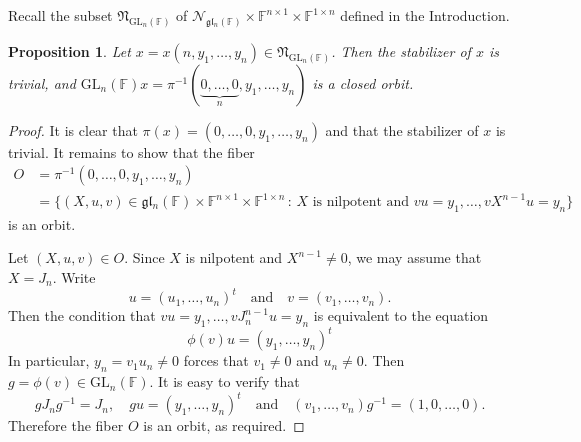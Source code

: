 \documentclass[12pt]{amsart}
\newtheorem{cor}[lm]{Corollary}
\newtheorem{prop}[lm]{Proposition}
\theoremstyle{definition}
\theoremstyle{remark}\newtheorem{rmk}[lm]{Remark}
\newcommand{\CN}{{\mathcal {N}}}
\newcommand{\GL}{{\mathrm{GL}}}
\newcommand{\gl}{\mathfrak g \mathfrak l}
\newcommand{\fN}{\mathfrak N}
\newcommand{\C}{\mathbb{F}}
\renewcommand{\mid}{\,:\,}
\begin{document}
    Recall the subset  $\fN_{\GL_n(\C)}$  of $\CN_{\gl_n(\C)}\times\C^{n\times 1}\times\C^{1\times n}$ defined in the Introduction.
    \begin{prop}
		\label{prop:maximalclosedgenerallinear}
		Let $x=x(n,y_1,\dots,y_n)\in\fN_{\GL_n(\C)}$. Then the stabilizer of $x$ is trivial, and $\GL_n(\C)x=\pi^{-1}(\underbrace{0,\dots,0}_n,y_1,\dots,y_n)$ is a closed orbit.
	\end{prop}
	\begin{proof}
		It is clear that $\pi(x)=(0,\dots,0,y_1,\dots,y_n)$ and that the stabilizer of $x$ is trivial. It remains to show that the fiber
		\begin{align*}
			O&=\pi^{-1}(0,\dots,0,y_1,\dots,y_n)\\
			&=\{(X,u,v)\in\gl_n(\C)\times\C^{n\times 1}\times\C^{1\times n}\mid X\text{ is nilpotent and }vu=y_1,\dots,vX^{n-1}u=y_n\}
		\end{align*}
		is an orbit.
		
		Let $(X,u,v)\in O$. Since $X$ is nilpotent and $X^{n-1}\neq 0$, we may assume that $X=J_n$. Write
		\begin{equation*}
			u=(u_1,\dots,u_n)^t\quad\text{and}\quad v=(v_1,\dots,v_n).
		\end{equation*}
		Then the condition that $vu=y_1,\dots,vJ_n^{n-1}u=y_n$ is equivalent to the equation
		\begin{equation*}
			\phi(v)u=(y_1,\dots,y_n)^t
		\end{equation*}
		In particular, $y_n=v_1u_n\neq 0$ forces that $v_1\neq 0$ and $u_n\neq 0$. Then $g=\phi(v)\in\GL_n(\C)$. It is easy to verify that
		\begin{equation*}
			gJ_ng^{-1}=J_n,\quad gu=(y_1,\dots,y_n)^t\quad\text{and}\quad(v_1,\dots,v_n)g^{-1}=(1,0,\dots,0).
		\end{equation*}
		Therefore the fiber $O$ is an orbit, as required.
	\end{proof}
\end{document}
